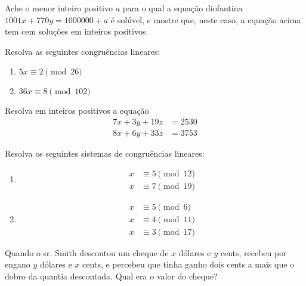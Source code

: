 \begin{questao}
  Ache o menor inteiro positivo $a$ para o qual a equação diofantina
  $1001x + 770y = 1000000+a$ é solúvel, e mostre que, neste caso, a
  equação acima tem cem soluções em inteiros positivos.
\end{questao}

\begin{questao}
  Resolva as seguintes congruências lineares:
  \begin{enumerate}

    \item $5x \equiv 2 \pmod{26}$


    \item $36x \equiv 8 \pmod{102}$
  \end{enumerate}
\end{questao}

\begin{questao}
  Resolva em inteiros positivos a equação
  \begin{align*}
    7x+3y+19z & = 2530 \\
    8x+6y+33z & = 3753
  \end{align*}
\end{questao}

\begin{questao}
  Resolva os seguintes sistemas de congruências lineares:
  \begin{enumerate}

    \item 
    \begin{align*}
      x & \equiv 5 \pmod{12} \\
      x & \equiv 7 \pmod{19}
    \end{align*}

    \item 
    \begin{align*}
      x & \equiv 5 \pmod{6} \\
      x & \equiv 4 \pmod{11} \\
      x & \equiv 3 \pmod{17}
    \end{align*}
  \end{enumerate}
\end{questao}

\begin{questao}
  Quando o sr. Smith descontou um cheque de $x$ dólares e $y$
  cents, recebeu por engano $y$ dólares e $x$ cents, e percebeu
  que tinha ganho dois cents a mais que o dobro da quantia
  descontada. Qual era o valor do cheque?
\end{questao}

